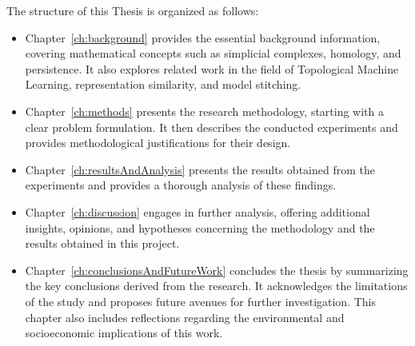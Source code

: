 \documentclass[../main.tex]{subfiles}
\begin{document}
The structure of this Thesis is organized as follows:
\begin{itemize}
    \item Chapter~\ref{ch:background} provides the essential background information, covering mathematical concepts such as simplicial complexes, homology, and persistence. It also explores related work in the field of Topological Machine Learning, representation similarity, and model stitching.

    \item Chapter~\ref{ch:methods} presents the research methodology, starting with a clear problem formulation. It then describes the conducted experiments and provides methodological justifications for their design.

    \item Chapter~\ref{ch:resultsAndAnalysis} presents the results obtained from the experiments and provides a thorough analysis of these findings.

    \item Chapter~\ref{ch:discussion} engages in further analysis, offering additional insights, opinions, and hypotheses concerning the methodology and the results obtained in this project.

    \item Chapter~\ref{ch:conclusionsAndFutureWork} concludes the thesis by summarizing the key conclusions derived from the research. It acknowledges the limitations of the study and proposes future avenues for further investigation. This chapter also includes reflections regarding the  environmental and socioeconomic implications of this work.
\end{itemize}
\end{document}
